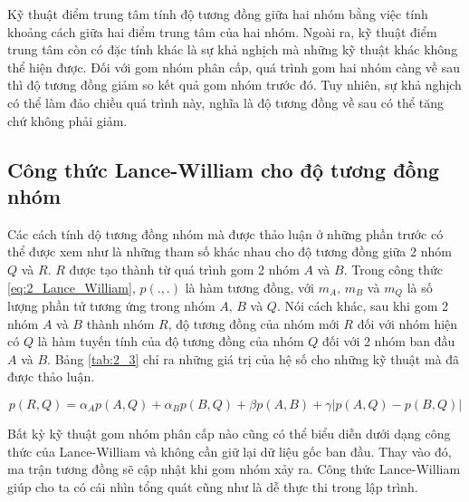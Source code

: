 Kỹ thuật điểm trung tâm tính độ tương đồng giữa hai nhóm bằng việc tính khoảng cách giữa hai điểm trung tâm của hai nhóm.
Ngoài ra, kỹ thuật điểm trung tâm còn có đặc tính khác là sự khả nghịch mà những kỹ thuật khác không thể hiện được.
Đối với gom nhóm phân cấp, quá trình gom hai nhóm càng về sau thì độ tương đồng giảm so kết quả gom nhóm trước đó.
Tuy nhiên, sự khả nghịch có thể làm đảo chiều quá trình này, nghĩa là độ tương đồng về sau có thể tăng chứ không phải giảm.

\subsection{Công thức Lance-William cho độ tương đồng nhóm}
Các cách tính dộ tương đồng nhóm mà được thảo luận ở những phần trước có thể được xem như là những tham số khác nhau cho độ tương đồng giữa 2 nhóm $Q$ và $R$.
$R$ được tạo thành từ quá trình gom 2 nhóm $A$ và $B$.
Trong công thức \ref{eq:2_Lance_William}, $p(.,.)$ là hàm tương đồng, với $m_A, \, m_B$ và $m_Q$ là số lượng phần tử tương ứng trong nhóm $A, \, B$ và $Q$.
Nói cách khác, sau khi gom 2 nhóm $A$ và $B$ thành nhóm $R$, độ tương đồng của nhóm mới $R$ đối với nhóm hiện có $Q$ là hàm tuyến tính của độ tương đồng của nhóm $Q$ đối với 2 nhóm ban đầu $A$ và $B$.
Bảng \ref{tab:2_3} chỉ ra những giá trị của hệ số cho những kỹ thuật mà đã được thảo luận.

\begin{equation}
\label{eq:2_Lance_William}
p(R,Q)=\alpha_Ap(A,Q) + \alpha_Bp(B,Q) + \beta p(A,B) + \gamma |p(A, Q) - p(B, Q)|
\end{equation}

Bất kỳ kỹ thuật gom nhóm phân cấp nào cũng có thể biểu diễn dưới dạng công thức của Lance-William và không cần giữ lại dữ liệu gốc ban đầu.
Thay vào đó, ma trận tương đồng sẽ cập nhật khi gom nhóm xảy ra.
Công thức Lance-William giúp cho ta có cái nhìn tổng quát cũng như là dễ thực thi trong lập trình.

\begin{table}[h!]
\centering
\caption{Hệ số của Lance-William dành cho các cách gom nhóm phân cấp}
\label{tab:2_3}
\end{table}

